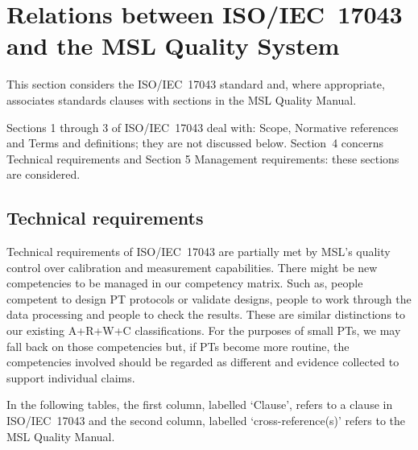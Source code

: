 \section{Relations between ISO/IEC~17043 and the MSL Quality System}
This section considers the ISO/IEC~17043 standard and, where appropriate, associates standards clauses with sections in the MSL Quality Manual. 

Sections 1 through 3 of ISO/IEC~17043 deal with: Scope, Normative references and Terms and definitions; they are not discussed below. Section~4 concerns Technical requirements and Section 5 Management requirements: these sections are considered.

\subsection{Technical requirements}

Technical requirements of ISO/IEC~17043 are partially met by MSL's quality control over calibration and measurement capabilities. There might be new competencies to be managed in our competency matrix. Such as, people competent to design PT protocols or validate designs, people to work through the data processing and people to check the results. These are similar distinctions to our existing A+R+W+C classifications. For the purposes of small PTs, we may fall back on those competencies but, if PTs become more routine, the competencies involved should be regarded as different and evidence collected to support individual claims.

In the following tables, the first column, labelled `Clause', refers to a clause in ISO/IEC~17043 and the second column, labelled `cross-reference(s)' refers to the MSL Quality Manual.

